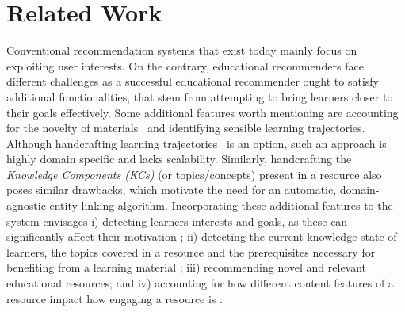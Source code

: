 \documentclass[letterpaper]{article} %
\begin{document}




\section{Related Work} \label{topic:related_work}

Conventional recommendation systems that exist today mainly focus on exploiting user interests. On the contrary, educational recommenders face different challenges as a successful educational recommender ought to satisfy additional functionalities, that stem from attempting to bring learners closer to their goals effectively. Some 
additional features worth mentioning are accounting for the novelty of materials~\cite{Drachsler:edurec} and identifying sensible learning trajectories. 
Although handcrafting learning trajectories~\cite{bauman2018recommending} is an option, such an approach is highly domain specific and lacks scalability. Similarly, handcrafting the \emph{Knowledge Components (KCs)} (or topics/concepts) present in a resource also poses similar drawbacks, which motivate the need for an automatic, domain-agnostic entity linking algorithm.
Incorporating these additional features to the system envisages i) detecting learners interests and goals, as these can significantly affect their motivation \cite{Salehi2014}; ii) detecting the current knowledge state of learners, the topics covered in a resource and the prerequisites necessary for benefiting from a learning material \cite{bauman2018recommending}; iii) recommending novel and relevant educational resources; and iv) accounting for how different content features of a resource impact how engaging a resource is
\cite{quality_features,Guo_vid_prod}.
\end{document}
